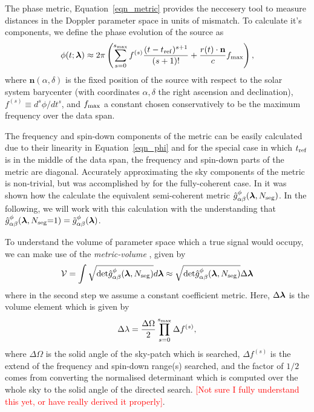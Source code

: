 \documentclass[aps, prd, twocolumn, superscriptaddress, floatfix, showpacs, nofootinbib, longbibliography]{revtex4-1}
\newcommand{\comment}[1]{\textcolor{red}{[#1]}}
\begin{document}
The phase metric, Equation~\eqref{eqn_metric} provides the neccesery tool to
measure distances in the Doppler parameter space in units of mismatch. To
calculate it's components, we define the phase evolution
of the source as \citep{wette2015}
\begin{align}
\phi(t; \boldsymbol{\mathbf{\lambda}}) \approx 2\pi\left(
\sum_{s=0}^{s_{\textrm{max}}} f^{(s)}\frac{(t-t_{\rm ref})^{s+1}}{(s+1)!}
+ \frac{r(t)\cdot\mathbf{n}}{c} f_{\textrm{max}}\right),
\label{eqn_phi}
\end{align}
where $\mathbf{n}(\alpha, \delta)$ is the fixed position of the source with
respect to the solar system barycenter (with coordinates $\alpha, \delta$ the
right ascension and declination), $f^(s)\equiv d^{s}\phi/dt^s$, and $f_{\textrm{max}}$
a constant chosen conservatively to be the maximum frequency over the data
span.

The frequency and spin-down components of the metric can be easily calculated
due to their linearity in Equation~\eqref{eqn_phi} and for the special case in
which $t_{\rm ref}$ is in the middle of the data span, the frequency and spin-down
parts of the metric are diagonal. Accurately approximating the sky components
of the metric is non-trivial, but was accomplished by \citet{wette2013} for the
fully-coherent case. In \citet{wette2015} it was shown how the calculate the
equivalent semi-coherent metric $\hat{g}_{\alpha\beta}^{\phi}(\boldsymbol{\mathbf{\lambda}},
N_{\rm seg})$.  In the following, we will work with this calculation with the
understanding that $\hat{g}_{\alpha\beta}^{\phi}(\boldsymbol{\mathbf{\lambda}}, N_{\rm seg}{=}1)=
\tilde{g}_{\alpha\beta}^{\phi}(\boldsymbol{\mathbf{\lambda}})$.

To understand the volume of parameter space which a true signal would occupy,
we can make use of the \emph{metric-volume} \citep{prix2007}, given by
\begin{align}
\mathcal{V} = \int 
\sqrt{\textrm{det}\hat{g}^{\phi}_{\alpha\beta}(\boldsymbol{\mathbf{\lambda}}, N_{\rm seg})} d\boldsymbol{\mathbf{\lambda}} \approx 
\sqrt{\textrm{det}\hat{g}^{\phi}_{\alpha\beta}(\boldsymbol{\mathbf{\lambda}}, N_{\rm seg})} \Delta\boldsymbol{\mathbf{\lambda}}
\end{align}
where in the second step we assume a constant coefficient metric. Here, $\Delta
\boldsymbol{\mathbf{\lambda}}$ is the volume element which is given by 
\begin{equation}
\Delta\lambda = \frac{\Delta\Omega}{2}
\prod_{s=0}^{s_{\textrm{max}}} \Delta f^{(s)},
\end{equation}
where $\Delta\Omega$ is the solid angle of the sky-patch which is searched,
$\Delta f^(s)$ is the extend of the frequency and spin-down range(s) searched,
and the factor of $1/2$ comes from converting the normalised determinant which
is computed over the whole sky to the solid angle of the directed search.
\comment{Not sure I fully understand this yet, or have really derived it properly}.
\end{document}
